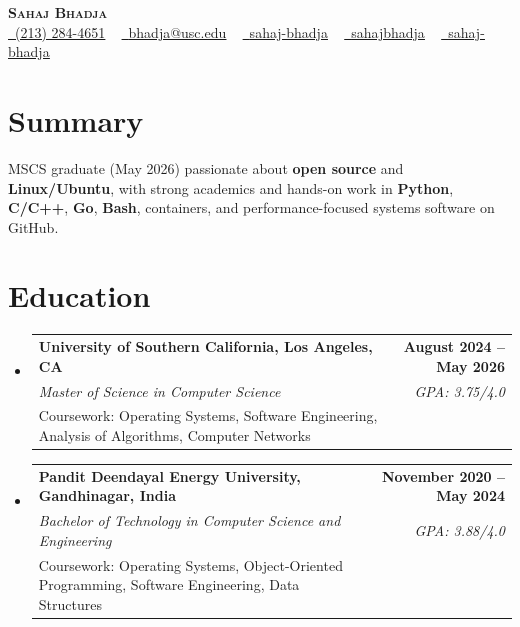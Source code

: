 \documentclass[letterpaper,10pt]{article}
\makeatletter
\newcommand{\resumeEduSubheading}[5]{\vspace{-1pt}\item\begin{tabular*}{1.0\textwidth}[t]{l@{\extracolsep{\fill}}r}\textbf{#1} & \textbf{\small #2} \\\textit{\small #3} & \textit{\small #4} \\\small #5 & \\\end{tabular*}\vspace{-4pt}}
\newcommand{\resumeSubHeadingListStart}{\begin{itemize}[leftmargin=0.0in, label={}]}
\newcommand{\resumeSubHeadingListEnd}{\end{itemize}}
\makeatother
\begin{document}
\begin{center}
{\Huge \scshape \textbf{Sahaj Bhadja}} \\ \vspace{1pt}
\small \href{tel:(213) 284-4651}{\faPhone\ \underline{(213) 284-4651}} ~ \href{mailto:bhadja@usc.edu}{\raisebox{-0.2\height}\faEnvelope\ \underline{bhadja@usc.edu}} ~
\href{https://www.linkedin.com/in/sahaj-bhadja/}{\raisebox{-0.2\height}\faLinkedin\ \underline{sahaj-bhadja}} ~ \href{https://github.com/SAHAJ-BHADJA}{\raisebox{-0.2\height}\faGithub\ \underline{sahajbhadja}} ~
\href{https://sahaj-bhadja.vercel.app/}{\raisebox{-0.2\height}\faGlobe\ \underline{sahaj-bhadja}}
\end{center}
\vspace{-18pt}
\section{Summary}
\begin{itemize}[leftmargin=0.15in, label={}]
\small{\item{MSCS graduate (May 2026) passionate about \textbf{open source} and \textbf{Linux/Ubuntu}, with strong academics and hands-on work in \textbf{Python}, \textbf{C/C++}, \textbf{Go}, \textbf{Bash}, containers, and performance-focused systems software on GitHub.}}
\end{itemize}
\vspace{-16pt}
\section{Education}
\resumeSubHeadingListStart
\resumeEduSubheading{University of Southern California, Los Angeles, CA}{August 2024 -- May 2026}{Master of Science in Computer Science}{GPA: 3.75/4.0}{Coursework: Operating Systems, Software Engineering, Analysis of Algorithms, Computer Networks}
\vspace{-9pt}
\resumeEduSubheading{Pandit Deendayal Energy University, Gandhinagar, India}{November 2020 -- May 2024}{Bachelor of Technology in Computer Science and Engineering}{GPA: 3.88/4.0}{Coursework: Operating Systems, Object-Oriented Programming, Software Engineering, Data Structures}
\resumeSubHeadingListEnd
\vspace{-14pt}
\end{document}
